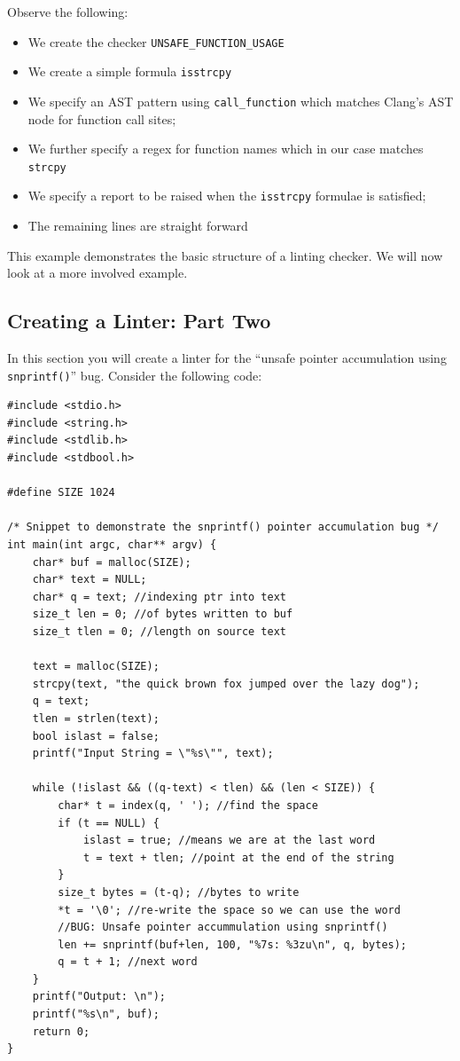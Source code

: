 Observe the following:
\begin{itemize}
	\itemsep0em
	\item We create the checker \verb|UNSAFE_FUNCTION_USAGE|
	\item We create a simple formula \verb|isstrcpy|
	\item We specify an AST pattern using \verb|call_function| which matches Clang's AST node for function call sites;
	\item We further specify a regex for function names which in our case matches \verb|strcpy|
	\item We specify a report to be raised when the \verb|isstrcpy| formulae is satisfied;
	\item The remaining lines are straight forward
\end{itemize}

This example demonstrates the basic structure of a linting checker. 
We will now look at a more involved example.

\subsection{Creating a Linter: Part Two}

In this section you will create a linter for the ``unsafe pointer accumulation 
using \verb|snprintf()|'' bug. Consider the following code:

\begin{verbatim}
#include <stdio.h>
#include <string.h>
#include <stdlib.h>
#include <stdbool.h>
    
#define SIZE 1024
    
/* Snippet to demonstrate the snprintf() pointer accumulation bug */
int main(int argc, char** argv) {
    char* buf = malloc(SIZE);
    char* text = NULL;
    char* q = text; //indexing ptr into text
    size_t len = 0; //of bytes written to buf 
    size_t tlen = 0; //length on source text
    
    text = malloc(SIZE);
    strcpy(text, "the quick brown fox jumped over the lazy dog");
    q = text;
    tlen = strlen(text);
    bool islast = false;
    printf("Input String = \"%s\"", text);

    while (!islast && ((q-text) < tlen) && (len < SIZE)) {
        char* t = index(q, ' '); //find the space
        if (t == NULL) {
            islast = true; //means we are at the last word
            t = text + tlen; //point at the end of the string 
        }
        size_t bytes = (t-q); //bytes to write
        *t = '\0'; //re-write the space so we can use the word
        //BUG: Unsafe pointer accummulation using snprintf()
        len += snprintf(buf+len, 100, "%7s: %3zu\n", q, bytes);
        q = t + 1; //next word
    }
    printf("Output: \n");
    printf("%s\n", buf);
    return 0;
}
    
\end{verbatim}

